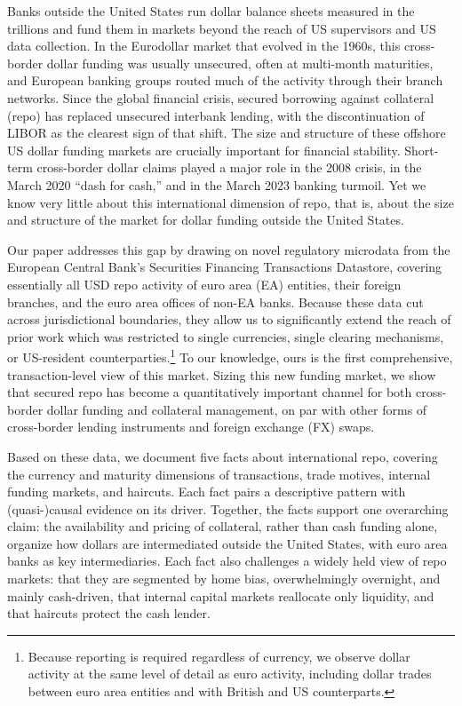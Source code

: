 \documentclass[english, 12pt, oneside]{article}
\begin{document}
Banks outside the United States run dollar balance sheets measured in the trillions and fund them in markets beyond the reach of US supervisors and US data collection.
In the Eurodollar market that evolved in the 1960s, this cross-border dollar funding was usually unsecured, often at multi-month maturities, and European banking groups routed much of the activity through their branch networks. Since the global financial crisis, secured borrowing against collateral (repo) has replaced unsecured interbank lending, with the discontinuation of LIBOR as the clearest sign of that shift. The size and structure of these offshore US dollar funding markets are crucially important for financial stability. Short-term cross-border dollar claims played a major role in the 2008 crisis, in the March 2020 ``dash for cash,'' and in the March 2023 banking turmoil.
Yet we know very little about this international dimension of repo, that is, about the size and structure of the market for dollar funding outside the United States.

Our paper addresses this gap by drawing on novel regulatory microdata from the European Central Bank's Securities Financing Transactions Datastore, covering essentially all USD repo activity of euro area (EA) entities, their foreign branches, and the euro area offices of non-EA banks.
Because these data cut across jurisdictional boundaries, they allow us to significantly extend the reach of prior work which was restricted to single currencies, single clearing mechanisms, or US-resident counterparties.\footnote{Because reporting is required regardless of currency, we observe dollar activity at the same level of detail as euro activity, including dollar trades between euro area entities and with British and US counterparts.}
To our knowledge, ours is the first comprehensive, transaction-level view of this market. Sizing this new funding market, we show that secured repo has become a quantitatively important channel for both cross-border dollar funding and collateral management, on par with other forms of cross-border lending instruments and foreign exchange (FX) swaps. 

Based on these data, we document five facts about international repo, covering the currency and maturity dimensions of transactions, trade motives, internal funding markets, and haircuts. Each fact pairs a descriptive pattern with (quasi-)causal evidence on its driver.
Together, the facts support one overarching claim: the availability and pricing of collateral, rather than cash funding alone, organize how dollars are intermediated outside the United States, with euro area banks as key intermediaries.
Each fact also challenges a widely held view of repo markets: that they are segmented by home bias, overwhelmingly overnight, and mainly cash-driven, that internal capital markets reallocate only liquidity, and that haircuts protect the cash lender.
\end{document}
